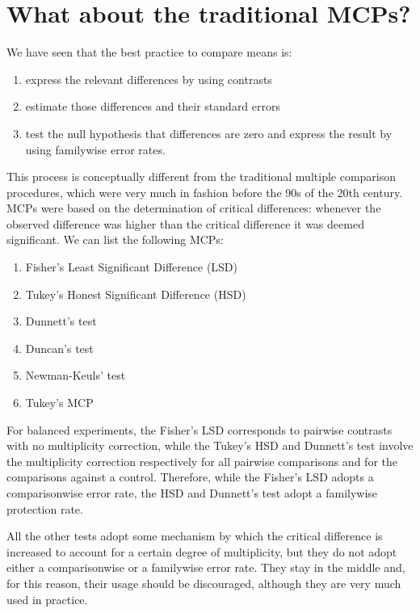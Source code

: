 \documentclass[a4paper,12pt,oneside]{book}
\providecommand{\tightlist}{%
  \setlength{\itemsep}{0pt}\setlength{\parskip}{0pt}}
\begin{document}
\hypertarget{what-about-the-traditional-mcps}{%
\section{What about the traditional MCPs?}\label{what-about-the-traditional-mcps}}

We have seen that the best practice to compare means is:

\begin{enumerate}
\def\labelenumi{\arabic{enumi}.}
\tightlist
\item
  express the relevant differences by using contrasts
\item
  estimate those differences and their standard errors
\item
  test the null hypothesis that differences are zero and express the result by using familywise error rates.
\end{enumerate}

This process is conceptually different from the traditional multiple comparison procedures, which were very much in fashion before the 90s of the 20th century. MCPs were based on the determination of critical differences: whenever the observed difference was higher than the critical difference it was deemed significant. We can list the following MCPs:

\begin{enumerate}
\def\labelenumi{\arabic{enumi}.}
\tightlist
\item
  Fisher's Least Significant Difference (LSD)
\item
  Tukey's Honest Significant Difference (HSD)
\item
  Dunnett's test
\item
  Duncan's test
\item
  Newman-Keuls' test
\item
  Tukey's MCP
\end{enumerate}

For balanced experiments, the Fisher's LSD corresponds to pairwise contrasts with no multiplicity correction, while the Tukey's HSD and Dunnett's test involve the multiplicity correction respectively for all pairwise comparisons and for the comparisons against a control. Therefore, while the Fisher's LSD adopts a comparisonwise error rate, the HSD and Dunnett's test adopt a familywise protection rate.

All the other tests adopt some mechanism by which the critical difference is increased to account for a certain degree of multiplicity, but they do not adopt either a comparisonwise or a familywise error rate. They stay in the middle and, for this reason, their usage should be discouraged, although they are very much used in practice.
\end{document}
